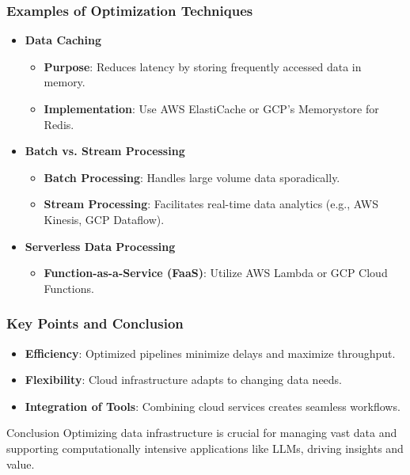\documentclass[aspectratio=169]{beamer}
\begin{document}
\begin{frame}[fragile]
    \frametitle{Examples of Optimization Techniques}
    \begin{itemize}
        \item \textbf{Data Caching}
            \begin{itemize}
                \item \textbf{Purpose}: Reduces latency by storing frequently accessed data in memory.
                \item \textbf{Implementation}: Use AWS ElastiCache or GCP’s Memorystore for Redis.
            \end{itemize}
        
        \item \textbf{Batch vs. Stream Processing}
            \begin{itemize}
                \item \textbf{Batch Processing}: Handles large volume data sporadically.
                \item \textbf{Stream Processing}: Facilitates real-time data analytics (e.g., AWS Kinesis, GCP Dataflow).
            \end{itemize}
        
        \item \textbf{Serverless Data Processing}
            \begin{itemize}
                \item \textbf{Function-as-a-Service (FaaS)}: Utilize AWS Lambda or GCP Cloud Functions.
            \end{itemize}
    \end{itemize}
\end{frame}

\begin{frame}[fragile]
    \frametitle{Key Points and Conclusion}
    \begin{itemize}
        \item \textbf{Efficiency}: Optimized pipelines minimize delays and maximize throughput.
        \item \textbf{Flexibility}: Cloud infrastructure adapts to changing data needs.
        \item \textbf{Integration of Tools}: Combining cloud services creates seamless workflows.
    \end{itemize}
    
    \begin{block}{Conclusion}
        Optimizing data infrastructure is crucial for managing vast data and supporting computationally intensive applications like LLMs, driving insights and value.
    \end{block}
\end{frame}
\end{document}

